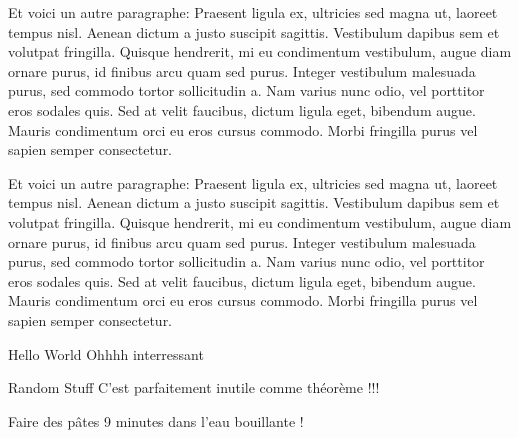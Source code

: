 \documentclass[11pt,compact]{lecture}
\begin{document}
\begin{example}[]{}
    Et voici un autre paragraphe: Praesent ligula ex, ultricies sed magna ut,
    laoreet tempus nisl. Aenean dictum a justo suscipit sagittis. Vestibulum dapibus
    sem et volutpat fringilla. Quisque hendrerit, mi eu condimentum vestibulum,
    augue diam ornare purus, id finibus arcu quam sed purus. Integer vestibulum
    malesuada purus, sed commodo tortor sollicitudin a. Nam varius nunc odio, vel
    porttitor eros sodales quis. Sed at velit faucibus, dictum ligula eget, bibendum
    augue. Mauris condimentum orci eu eros cursus commodo. Morbi fringilla purus vel
    sapien semper consectetur. 

    Et voici un autre paragraphe: Praesent ligula ex, ultricies sed magna ut,
    laoreet tempus nisl. Aenean dictum a justo suscipit sagittis. Vestibulum dapibus
    sem et volutpat fringilla. Quisque hendrerit, mi eu condimentum vestibulum,
    augue diam ornare purus, id finibus arcu quam sed purus. Integer vestibulum
    malesuada purus, sed commodo tortor sollicitudin a. Nam varius nunc odio, vel
    porttitor eros sodales quis. Sed at velit faucibus, dictum ligula eget, bibendum
    augue. Mauris condimentum orci eu eros cursus commodo. Morbi fringilla purus vel
    sapien semper consectetur. 
\end{example}


\begin{hardexercise}[]{Hello World}
    Ohhhh interressant
\end{hardexercise}


\begin{theorem}[]{Random Stuff}
    C'est parfaitement inutile comme théorème !!!
\end{theorem}


\begin{method}[]{Faire des pâtes}
    9 minutes dans l'eau bouillante !
\end{method}
\end{document}
